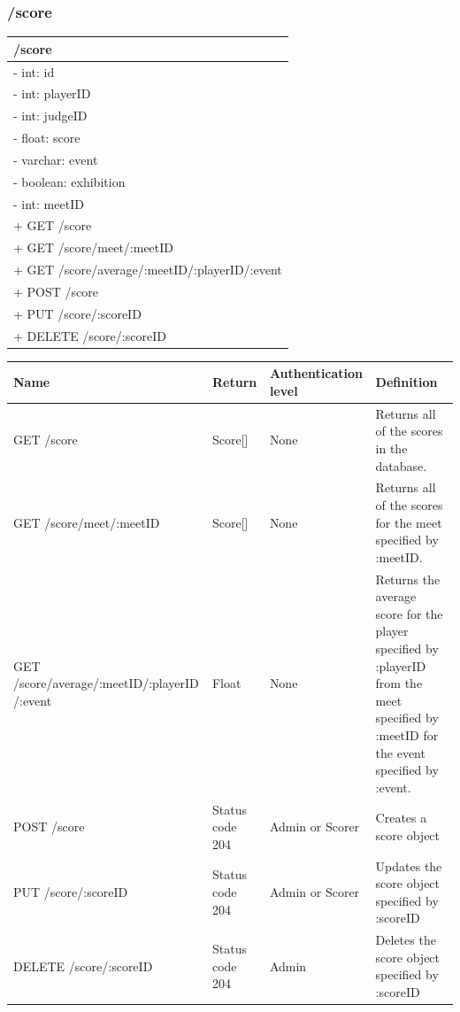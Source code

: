 \documentclass[letterpaper,10pt,draftclsnofoot,onecolumn,]{article}
\begin{document}
\subsubsection{/score}
\begin{center}
    \begin{tabular}{| p{22em} |}
        \hline
        \textbf{/score} \\
        \hline
        - int: id \\
        - int: playerID \\
        - int: judgeID \\
        - float: score \\
        - varchar: event \\
        - boolean: exhibition \\
        - int: meetID \\
        \hline
        + GET /score \\
        + GET /score/meet/:meetID \\
        + GET /score/average/:meetID/:playerID/:event \\
        + POST /score \\
        + PUT /score/:scoreID \\
        + DELETE /score/:scoreID \\
        \hline
    \end{tabular}
\end{center}
\begin{center}
    \begin{tabular}{ | p{15em} | p{8em} | p{7em} | p{20em} | }
        \hline
        \textbf{Name} & \textbf{Return} & \textbf{Authentication level} & \textbf{Definition} \\
        \hline
        GET /score & Score[] & None & Returns all of the scores in the database. \\
        \hline
        GET /score/meet/:meetID & Score[] & None & Returns all of the scores for the meet specified by :meetID. \\
        \hline
        GET /score/average/:meetID/:playerID /:event & Float & None & Returns the average score for the player specified by :playerID from the meet specified by :meetID for the event specified by :event. \\
        \hline
        POST /score & Status code 204 & Admin or Scorer & Creates a score object \\
        \hline
        PUT /score/:scoreID & Status code 204 & Admin or Scorer & Updates the score object specified by :scoreID \\
        \hline
        DELETE /score/:scoreID & Status code 204 & Admin & Deletes the score object specified by :scoreID \\
        \hline
    \end{tabular}
\end{center}
\end{document}
